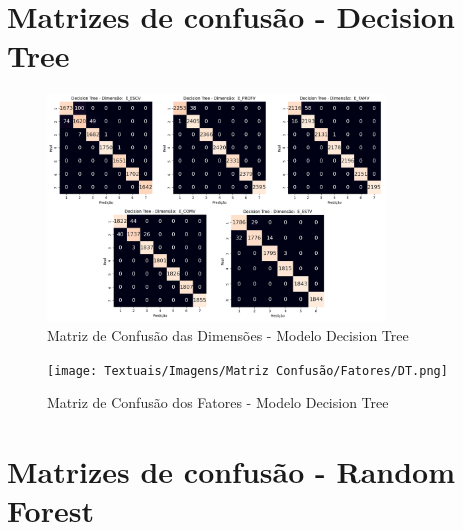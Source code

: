 

                      \begin{apendicesenv}

\partapendices

                      \chapter{Matrizes de confusão - Decision Tree}
                      \label{ap1}

\begin{figure}[ht]
    \centering
    \includegraphics[width=0.8\textwidth]{Textuais/Imagens/Matriz Confusão/Dimensões/dim_dt.png}
    \caption{Matriz de Confusão das Dimensões - Modelo Decision Tree}
    \label{fig:matriz_confusao_dim_dt}
\end{figure}

\begin{figure}[ht]
    \centering
    \texttt{[image: Textuais/Imagens/Matriz Confusão/Fatores/DT.png]}
    \caption{Matriz de Confusão dos Fatores - Modelo Decision Tree}
    \label{fig:matriz_confusao_fat_dt}
\end{figure}

                      \chapter{Matrizes de confusão - Random Forest}
                      \label{ap2}


\end{apendicesenv}
